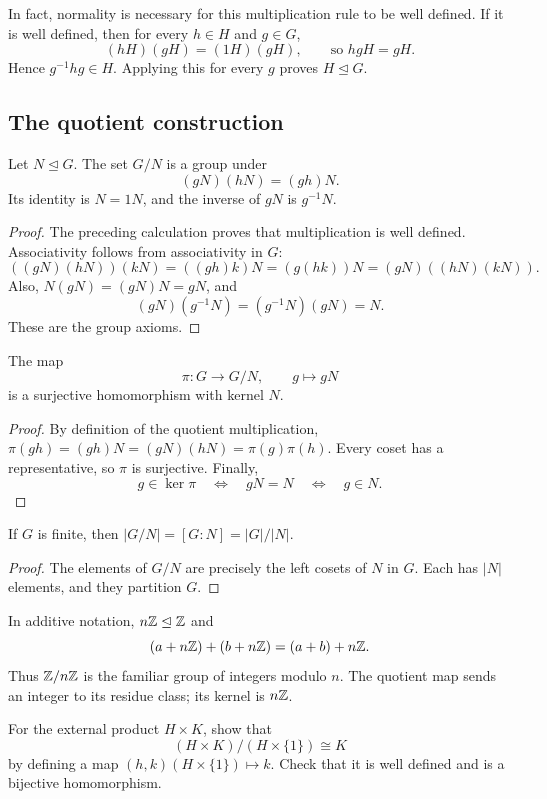 \documentclass[reqno,11pt]{amsart}
\begin{document}
\begin{remark}
In fact, normality is necessary for this multiplication rule to be well
defined. If it is well defined, then for every $h\in H$ and $g\in G$,
\[
  (hH)(gH)=(1H)(gH),\qquad\text{so }hgH=gH.
\]
Hence $g^{-1}hg\in H$. Applying this for every $g$ proves
$H\trianglelefteq G$.
\end{remark}

\subsection{The quotient construction}

\begin{theorem}
Let $N\trianglelefteq G$. The set $G/N$ is a group under
\[
  (gN)(hN)=(gh)N.
\]
Its identity is $N=1N$, and the inverse of $gN$ is $g^{-1}N$.
\end{theorem}
\begin{proof}
The preceding calculation proves that multiplication is well defined.
Associativity follows from associativity in $G$:
\[
 ((gN)(hN))(kN)=((gh)k)N=(g(hk))N=(gN)((hN)(kN)).
\]
Also, $N(gN)=(gN)N=gN$, and
\[
  (gN)(g^{-1}N)=(g^{-1}N)(gN)=N.
\]
These are the group axioms.
\end{proof}

\begin{theorem}
The map
\[
  \pi:G\longrightarrow G/N,\qquad g\longmapsto gN
\]
is a surjective homomorphism with kernel $N$.
\end{theorem}
\begin{proof}
By definition of the quotient multiplication,
$\pi(gh)=(gh)N=(gN)(hN)=\pi(g)\pi(h)$.
Every coset has a representative, so $\pi$ is surjective. Finally,
\[
  g\in\ker\pi\quad\Longleftrightarrow\quad gN=N
  \quad\Longleftrightarrow\quad g\in N.
\]
\end{proof}

\begin{corollary}
If $G$ is finite, then $|G/N|=[G:N]=|G|/|N|$.
\end{corollary}
\begin{proof}
The elements of $G/N$ are precisely the left cosets of $N$ in $G$.
Each has $|N|$ elements, and they partition $G$.
\end{proof}

\begin{example}
In additive notation, $n\mathbb{Z}\trianglelefteq\mathbb{Z}$ and
\[
  (a+n\mathbb{Z})+(b+n\mathbb{Z})=(a+b)+n\mathbb{Z}.
\]
Thus $\mathbb{Z}/n\mathbb{Z}$ is the familiar group of integers modulo $n$.
The quotient map sends an integer to its residue class; its kernel is
$n\mathbb{Z}$.
\end{example}

\begin{exercise}
For the external product $H\times K$, show that
\[
  (H\times K)/(H\times\{1\})\cong K
\]
by defining a map $(h,k)(H\times\{1\})\mapsto k$.
Check that it is well defined and is a bijective homomorphism.
\end{exercise}
\end{document}
